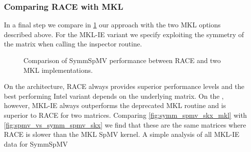 \subsubsection{Comparing \acrshort{RACE} with \acrshort{MKL}}
In a final step we compare  in \cref{fig:symm_spmv_mkl} our approach with the two \acrshort{MKL} options described above. For the MKL-IE variant we specify exploiting the symmetry of the matrix when calling the inspector routine. 
%
\begin{figure}[tbp]
	\centering
	\hspace{1em}
	\caption{Comparison of \acrshort{SymmSpMV} performance between \acrshort{RACE} and two \acrshort{MKL} implementations.}
	\label{fig:symm_spmv_mkl}
\end{figure}
On the \IVB architecture, \acrshort{RACE} always provides superior performance levels and the best performing Intel variant depends on the underlying matrix. On the \SKX, however, MKL-IE always outperforms the deprecated MKL routine and is superior to \acrshort{RACE} for two matrices. Comparing \cref{fig:symm_spmv_skx_mkl} with \cref{fig:spmv_vs_symm_spmv_skx} we find that these are the same matrices where \acrshort{RACE} is slower than the MKL \acrshort{SpMV} kernel. A simple analysis of all MKL-IE data for \acrshort{SymmSpMV} 

